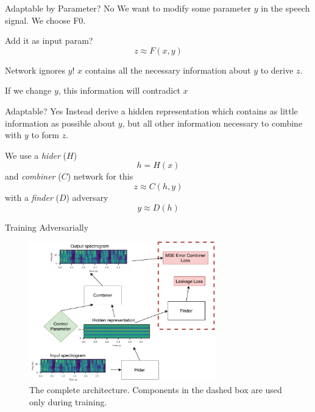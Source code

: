 \documentclass[10pt]{beamer}
\begin{document}
\begin{frame}{Adaptable by Parameter? No}
We want to modify some parameter $y$ in the speech signal. We choose F0.

Add it as input param?
\begin{equation}
    z \approx F(x,y)
\end{equation}
	\begin{alertblock}{Network ignores $y$!}
	$x$ contains all the necessary information about $y$ to derive $z$.
	
	If we change $y$, this information will contradict $x$
	\end{alertblock}
\end{frame}

\begin{frame}{Adaptable? Yes}
Instead derive a hidden representation which contains as little information as possible about $y$, but all other information necessary to combine with $y$ to form $z$.

We use a \emph{hider} ($H$) 
\begin{equation}
    h = H(x)
\end{equation}
and \emph{combiner} ($C$) network for this
\begin{equation}
    z \approx C(h,y)
\end{equation}
with a \emph{finder} ($D$) adversary
\begin{equation}
    y \approx D(h)
\end{equation}
\end{frame}

\begin{frame}[fragile]{Training Adversarially}
    \begin{figure}[h]
    \includegraphics[width=0.72\textwidth]{figures/adversarial-training.pdf}
  \caption{The complete architecture. Components in the dashed box are used only during training.}
  \label{fig:adverse-over}
\end{figure}
\end{frame}
\end{document}
